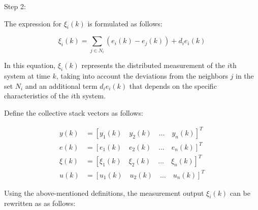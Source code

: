 \documentclass[journal,onecolumn]{IEEEtran}
\begin{document}







Step 2:

The expression for \(\xi_i(k)\) is formulated as follows:

\begin{equation}
    \label{model 27}
    \xi_i(k) = \sum_{j \in N_i} (e_i(k) - e_j(k)) + d_i e_i(k)
\end{equation}

In this equation, \(\xi_i(k)\) represents the distributed measurement of the $i$th system at time \(k\), taking into account the deviations from the neighbors \(j\) in the set \(N_i\) and an additional term \(d_i e_i(k)\) that depends on the specific characteristics of the $i$th system.

Define the collective stack vectors as follows:

    
\begin{align*}
    y(k)   &= \left[ y_1(k) \quad y_2(k) \quad \dots \quad y_n(k) \right]^T \\
    e(k)   &= \left[ e_1(k) \quad e_2(k) \quad \dots \quad e_n(k) \right]^T \\ 
    \xi(k) &= \left[ \xi_1(k) \quad \xi_2(k) \quad \dots \quad \xi_n(k) \right]^T \\
    u(k)   &= \left[ u_1(k) \quad u_2(k) \quad \dots \quad u_n(k) \right]^T
    \end{align*}
    

Using the above-mentioned definitions, the measurement output \(\xi_i(k)\) can be rewritten as as follows:
\end{document}
